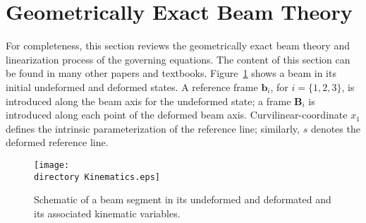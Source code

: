 \section{Geometrically Exact Beam Theory}

For completeness, this section reviews the geometrically exact beam theory
and linearization process of the governing equations. The content of this
section can be found in many other papers and textbooks.
Figure~\ref{Kinematics} shows a beam in its initial undeformed and deformed
states. A reference frame $\mathbf{b}_i$, for $i=\{ 1,2,3 \}$, is introduced
along the beam axis for the undeformed state; a frame $\mathbf{B}_i$ is
introduced along each point of the deformed beam axis.
Curvilinear-coordinate $x_1$ defines the intrinsic parameterization of the
reference line; similarly, $s$ denotes the deformed reference line.

\begin{figure}
\centering
\texttt{[image: \\directory Kinematics.eps]}
\caption{Schematic of a beam segment in its undeformed and deformated and
its associated kinematic variables.} \label{Kinematics}
\end{figure}

